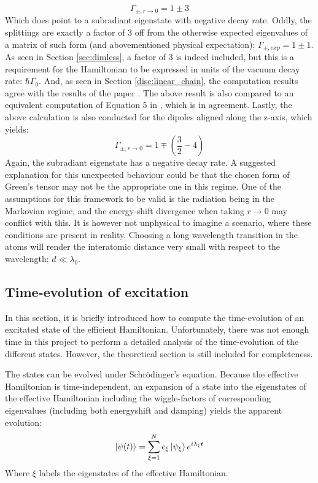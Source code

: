 \documentclass{article}
\begin{document}
\begin{equation}\label{eq:N2_decayrates_ex}
    \Gamma_{\pm,r\rightarrow 0} = 1 \pm 3
\end{equation}
Which does point to a subradiant eigenstate with negative decay rate. Oddly, the splittings are exactly a factor of 3 off from the otherwise expected eigenvalues of a matrix of such form (and abovementioned physical expectation): $\Gamma_{\pm, exp} = 1 \pm 1$. As seen in Section \ref{sec:dimless}, a factor of 3 is indeed included, but this is a requirement for the Hamiltonian to be expressed in units of the vacuum decay rate: $\hbar \Gamma_0$. And, as seen in Section \ref{disc:linear_chain}, the computation results agree with the results of the paper \cite{Asenjo}. The above result is also compared to an equivalent computation of Equation 5 in \cite{PetrosyanMolmer}, which is in agreement. Lastly, the above calculation is also conducted for the dipoles aligned along the z-axis, which yields:
\begin{equation}\label{eq:N2_decayrates_ez}
    \Gamma_{\pm, r\rightarrow 0} = 1 \mp \left( \frac{3}{2} - 4 \right)
\end{equation}
Again, the subradiant eigenstate has a negative decay rate. A suggested explanation for this unexpected behaviour could be that the chosen form of Green's tensor may not be the appropriate one in this regime. One of the assumptions for this framework to be valid is the radiation being in the Markovian regime, and the energy-shift divergence when taking $r\rightarrow 0$ may conflict with this. It is however not unphysical to imagine a scenario, where these conditions are present in reality. Choosing a long wavelength transition in the atoms will render the interatomic distance very small with respect to the wavelength: $d \ll \lambda_0$. 

\subsection{Time-evolution of excitation}\label{sec:time-evolution}

In this section, it is briefly introduced how to compute the time-evolution of an excitated state of the efficient Hamiltonian. Unfortunately, there was not enough time in this project to perform a detailed analysis of the time-evolution of the different states. However, the theoretical section is still included for completeness.

The states can be evolved under Schrödinger's equation. Because the effective Hamiltonian is time-independent, an expansion of a state into the eigenstates of the effective Hamiltonian including the wiggle-factors of corresponding eigenvalues (including both energyshift and damping) yields the apparent evolution:
\begin{equation}
    \begin{split}
        \ket{\psi (t)} = \sum_{\xi=1}^N c_\xi \ket{\psi_\xi} e^{i \lambda_\xi t}
    \end{split}
\end{equation}
Where $\xi$ labels the eigenstates of the effective Hamiltonian. 
\end{document}
